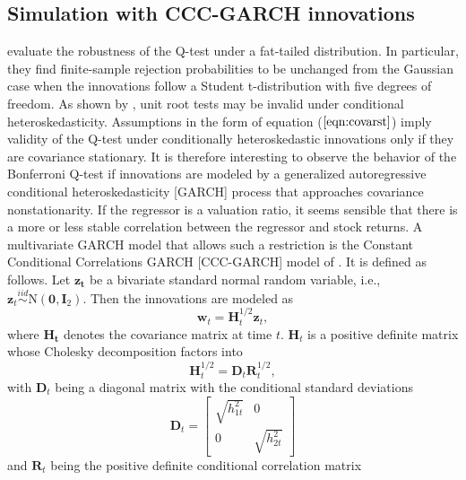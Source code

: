 \documentclass{article}
\begin{document}
\subsection{Simulation with CCC-GARCH innovations}
\label{Simulation with CCC-GARCH innovations}
\citet{campbell2006efficient} evaluate the robustness of the Q-test under a fat-tailed distribution. In particular, they find finite-sample rejection probabilities to be unchanged from the Gaussian case when the innovations follow a Student t-distribution with five degrees of freedom. As shown by \citet{cavaliere2005unit}, unit root tests may be invalid under conditional heteroskedasticity. Assumptions in the form of equation ($\ref{eqn:covarst}$) imply validity of the Q-test under conditionally heteroskedastic innovations only if they are covariance stationary. 
It is therefore interesting to observe the behavior of the Bonferroni Q-test if innovations are modeled by a generalized autoregressive conditional heteroskedasticity [GARCH] process that approaches covariance nonstationarity. If the regressor is a valuation ratio, it seems sensible that there is a more or less stable correlation between the regressor and stock returns. A multivariate GARCH model that allows such a restriction is the Constant Conditional Correlations GARCH  [CCC-GARCH] model of \citet{bollerslev1990modelling}. It is defined as follows. Let $ \boldsymbol{z_{t}}$ be a bivariate standard normal random variable, i.e., $ \boldsymbol{z}_{t} \stackrel{i i d}{\sim} \mathrm{N}\left(\mathbf{0}, \boldsymbol{I}_{2}\right)$. Then the innovations are modeled as 
\begin{equation}
 \boldsymbol{w}_{t}=\boldsymbol{H}_{t}^{1 / 2} \boldsymbol{z}_{t},
\end{equation}
where $ \boldsymbol{H_t}$ denotes the covariance matrix at time $t$. $\boldsymbol{H}_{t}$ is a positive definite matrix whose Cholesky decomposition factors into 
\begin{equation}
\boldsymbol{H}_{t}^{1/2} = \boldsymbol{D}_{t} \boldsymbol{R}_{t}^{1 / 2},
\end{equation}
with $\boldsymbol{D}_{t}$ being a diagonal matrix with the conditional standard deviations 
\begin{equation}
\label{eqn:40}
\boldsymbol{D}_{t}=\left[\begin{array}{cc}{\sqrt{h_{1 t}^{2}}} & {0} \\ {0} & {\sqrt{h_{2 t}^{2}}}\end{array}\right]
\end{equation}
and $\boldsymbol{R}_{t}$ being the positive definite conditional correlation matrix 
\end{document}
